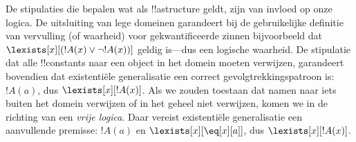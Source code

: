 \documentclass[../../../include/open-logic-section]{subfiles}
\begin{document}
\begin{digress}
De stipulaties die bepalen wat als !!a{structure} geldt, zijn van
invloed op onze logica. De uitsluiting van lege domeinen garandeert bij
de gebruikelijke definitie van vervulling (of waarheid) voor
gekwantificeerde zinnen bijvoorbeeld dat
$\lexists[x][(!A(x) \lor \lnot !A(x))]$ geldig is---dus een logische
waarheid. De stipulatie dat alle !!{constant}s naar een object in het
domein moeten verwijzen, garandeert bovendien dat existentiële
generalisatie een correct gevolgtrekkingspatroon is: $!A(a)$, dus
$\lexists[x][!A(x)]$. Als we zouden toestaan dat namen naar iets buiten
het domein verwijzen of in het geheel niet verwijzen, komen we in de
richting van een \emph{vrije logica}. Daar vereist existentiële
generalisatie een aanvullende premisse: $!A(a)$ en
$\lexists[x][\eq[x][a]]$, dus $\lexists[x][!A(x)]$.
\end{digress}
\end{document}
